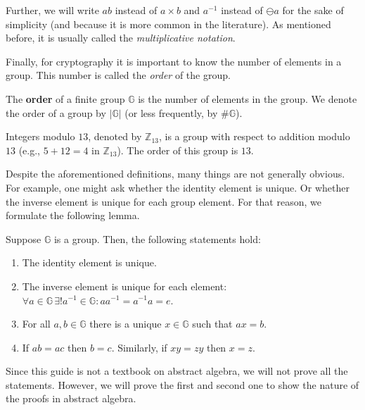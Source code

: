 \documentclass[../../book.tex]{subfiles}
\begin{document}
\begin{remark}
    Further, we will write $ab$ instead of $a \times b$ and $a^{-1}$ instead of $\ominus a$ for the sake of simplicity (and because it is more common in the literature). As mentioned before, it is usually called the \textit{multiplicative notation}.
\end{remark}

Finally, for cryptography it is important to know the number of elements in a group. This number is called the \textit{order} of the group.
\begin{definition}
    The \textbf{order} of a finite group $\mathbb{G}$ is the number of elements in the group. We denote the order of a group by $|\mathbb{G}|$ (or less frequently, by $\#\mathbb{G}$).
\end{definition}
\begin{example}
    Integers modulo $13$, denoted by $\mathbb{Z}_{13}$, is a group with respect to addition modulo $13$ 
    (e.g., $5+12=4$ in $\mathbb{Z}_{13}$). The order of this group is $13$.
\end{example}

Despite the aforementioned definitions, many things are not generally obvious. For example, one might ask whether the identity element is unique. Or
whether the inverse element is unique for each group element. For that reason, we formulate the following lemma.

\begin{lemma}
    Suppose $\mathbb{G}$ is a group. Then, the following statements hold:
    \begin{enumerate}
        \item The identity element is unique.
        \item The inverse element is unique for each element: $\forall a \in \mathbb{G} \, \exists! a^{-1} \in \mathbb{G}: aa^{-1} = a^{-1}a = e$.
        \item For all $a,b \in \mathbb{G}$ there is a unique $x \in \mathbb{G}$ such that $ax = b$.
        \item If $ab=ac$ then $b=c$. Similarly, if $xy=zy$ then $x=z$.
    \end{enumerate}
\end{lemma}

Since this guide is not a textbook on abstract algebra, we will not prove all the statements. However, we will prove the first and second one to show the nature of the proofs in abstract algebra.
\end{document}
